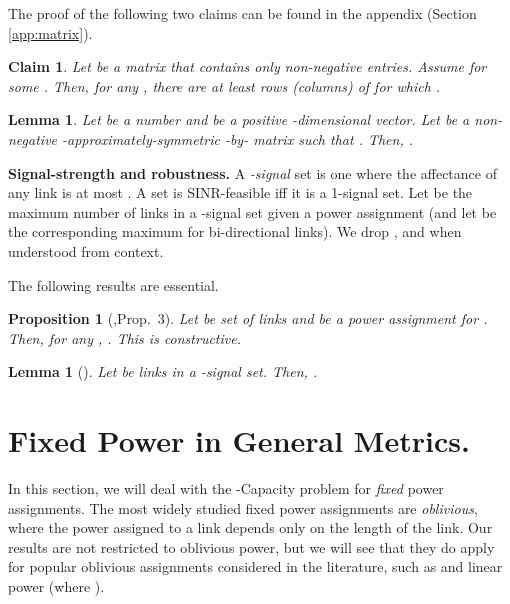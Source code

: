 \documentclass[11pt]{amsart}
\newcommand{\prob}[1]{\textsf{#1}}  \newcommand{\myparagraph}[1]{\smallskip\noindent\textbf{#1}\quad}
\newcounter{foo}
\newtheorem{lemma}[foo]{Lemma}
\newtheorem{proposition}{Proposition}[section]
\newtheorem{claim}[foo]{Claim}
\begin{document}
The proof of the following two claims can be found in the appendix (Section \ref{app:matrix}).
\begin{claim}
\label{matrixsumclaim}
Let  be a  matrix that contains only non-negative
entries. Assume  for some . Then, for any , there are at least 
 rows (columns)  of  for which .
\end{claim}

\begin{lemma}
Let  be a number and  be a positive -dimensional vector.
Let  be a non-negative -approximately-symmetric -by-
matrix such that .
Then, .
\label{lem:nearly-symm}
\end{lemma}


\myparagraph{Signal-strength and robustness.}
A \emph{-signal} set is one where the
affectance of any link is at most .
A set is SINR-feasible iff it is a 1-signal set.
Let  be the maximum number of links in a
-signal set given a power assignment  (and let  be the 
corresponding maximum for bi-directional links). We drop ,  and
 when understood from context.


The following results are essential.


\begin{proposition}[\cite{FKRV09},Prop.~3]
Let  be set of links and  be a power assignment
for .
Then, for any , . 
This is constructive.
\label{prop:signal-length}
\end{proposition}




\iffalse
\begin{proposition}[\cite{HW09}]
Let  be a set of links and .
Then, Then,

\label{prop:signal-length}
\end{proposition}
\fi



\begin{lemma}[\cite{us:esa09full}]
Let  be links in a -signal set.
Then, . 
\label{lem:ind-separation}
\end{lemma}





\section{Fixed Power in General Metrics.}

In this section, we will deal with the \prob{-Capacity} problem
for \emph{fixed} power assignments.  The most widely studied fixed power
assignments are \emph{oblivious}, 
where the power assigned to a link depends only on the length
of the link. Our results are not restricted to oblivious power, but we will
see that they do apply for popular oblivious assignments considered in the 
literature, such as  and linear power (where ).
\end{document}
